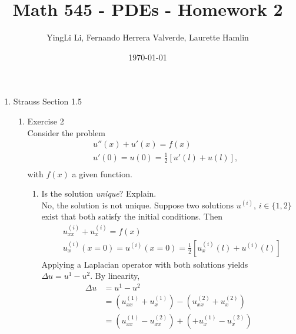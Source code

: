 \documentclass[12pt]{article}%
\begin{document}
\setlength{\parindent}{20pt}

\title{Math 545 - PDEs - Homework 2}
\author{YingLi Li, Fernando Herrera Valverde, Laurette Hamlin}
\date{\today}
\maketitle

\begin{enumerate}
    \item Strauss Section 1.5 \smallskip
    \begin{enumerate}
        \item Exercise 2 \smallskip \\
        Consider the problem
        \begin{align*}
            &u''\left(x\right) + u'\left(x\right) = f\left(x\right) \\
            &u'\left(0\right)=u\left(0\right)=\frac{1}{2}\left[ u'\left(l\right) + u\left(l\right) \right] \text{,} \\
        \end{align*} 
        with $f\left(x\right)$ a given function.
        \begin{enumerate}
            \item Is the solution \emph{unique}? Explain. \\
                No, the solution is not unique. Suppose two solutions $u^{\left(i\right)}$, $i \in \{1,2\}$ exist that both satisfy the initial conditions.  Then 
                \begin{align*}
                    &u^{\left(i\right)}_{xx} + u^{\left(i\right)}_{x} = f\left(x\right) \\
                    &u^{\left(i\right)}_{x}\left(x=0\right)=u^{\left(i\right)}\left(x=0\right)=\frac{1}{2}\left[ u^{\left(i\right)}_{x}\left(l\right) + u^{\left(i\right)}\left(l\right) \right]
                \end{align*}
                Applying a Laplacian operator with both solutions yields $\Delta u = u^1 - u^2$. By linearity,
                \begin{align*}
                    \Delta u &= u^1 - u^2 \\
                    &= \left(u^{\left(1\right)}_{xx} + u^{\left(1\right)}_{x}\right)
                    - \left( u^{\left(2\right)}_{xx} + u^{\left(2\right)}_{x}\right) \\
                    &= \left(u^{\left(1\right)}_{xx} - u^{\left(2\right)}_{xx}\right)
                    + \left(+ u^{\left(1\right)}_{x} - u^{\left(2\right)}_{x}\right) \\ 

\end{align*}
\end{enumerate}
\end{enumerate}
\end{enumerate}
\end{document}
